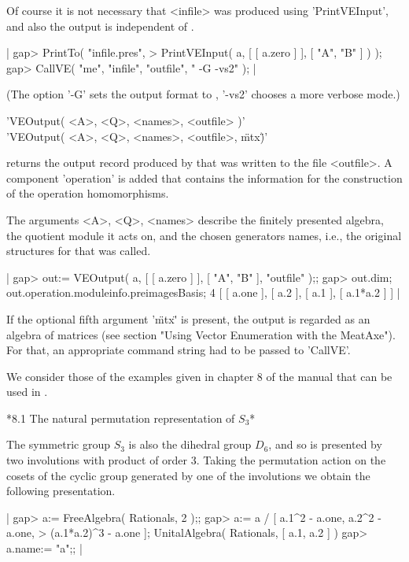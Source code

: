 Of course it is not necessary that <infile> was produced using
'PrintVEInput', and also the output is independent of {\GAP}.

|    gap> PrintTo( "infile.pres",
    >             PrintVEInput( a, [ [ a.zero ] ], [ "A", "B" ] ) );
    gap> CallVE( "me", "infile", "outfile", " -G -vs2" ); |

(The option '-G' sets the output format to {\GAP}, '-vs2' chooses a
more verbose mode.)

\vspace{5mm}

'VEOutput( <A>, <Q>, <names>, <outfile> )'\\
'VEOutput( <A>, <Q>, <names>, <outfile>, \"mtx\" )'

returns the output record produced by {\VE} that was written to the file
<outfile>.
A component 'operation' is added that contains the information for the
construction of the operation homomorphisms.

The arguments <A>, <Q>, <names> describe the finitely presented algebra,
the quotient module it acts on, and the chosen generators names, i.e.,
the original structures for that {\VE} was called.

|    gap> out:= VEOutput( a, [ [ a.zero ] ], [ "A", "B" ], "outfile" );;
    gap> out.dim; out.operation.moduleinfo.preimagesBasis;
    4
    [ [ a.one ], [ a.2 ], [ a.1 ], [ a.1*a.2 ] ] |

If the optional fifth argument '\"mtx\"' is present, the output is regarded
as an algebra of {\MeatAxe} matrices (see section "Using Vector Enumeration
with the MeatAxe").  For that, an appropriate command string had to be passed
to 'CallVE'.


We consider those of the examples given in chapter 8 of the {\VE} manual
that can be used in {\GAP}.

*8.1 The natural permutation representation of $S_3$*

The symmetric group $S_3$ is also the dihedral group $D_6$, and so is
presented by two involutions with product of order 3.
Taking the permutation action on the cosets of the cyclic group generated
by one of the involutions we obtain the following presentation.

|    gap> a:= FreeAlgebra( Rationals, 2 );;
    gap> a:= a / [ a.1^2 - a.one, a.2^2 - a.one,
    >              (a.1*a.2)^3 - a.one ];
    UnitalAlgebra( Rationals, [ a.1, a.2 ] )
    gap> a.name:= "a";; |
    
